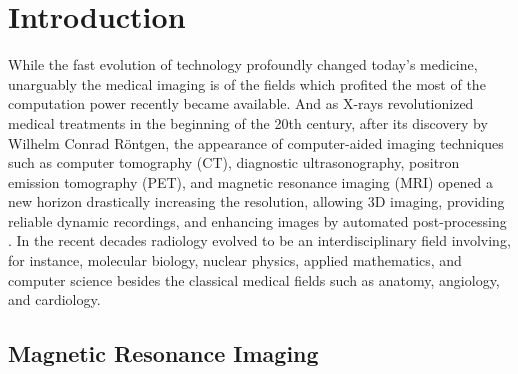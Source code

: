 \chapter{Introduction}\label{chapter:introduction}

While the fast evolution of technology profoundly changed today's medicine, unarguably the medical imaging is of the fields which profited the most of the computation power recently became available. And as X-rays revolutionized medical treatments in the beginning of the 20th century, after its discovery by Wilhelm Conrad Röntgen,  the appearance of computer-aided imaging techniques such as computer tomography (CT), diagnostic ultrasonography, positron emission tomography (PET), and magnetic resonance imaging (MRI) opened a new horizon drastically increasing the resolution, allowing 3D imaging, providing reliable dynamic recordings, and enhancing images by automated post-processing \cite{mri_picturetoproton}. In the recent decades radiology evolved to be an interdisciplinary field involving, for instance, molecular biology, nuclear physics, applied mathematics, and computer science besides the classical medical fields such as anatomy, angiology, and cardiology.

\section{Magnetic Resonance Imaging}

